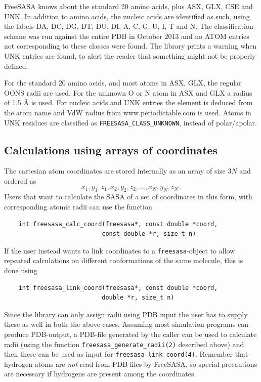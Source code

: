 \documentclass[a4paper,11pt]{article}
\begin{document}
FreeSASA knows about the standard 20 amino acids, plus ASX, GLX,
CSE and UNK. In addition to amino acids, the nucleic acids are
identified as such, using the labels DA, DC, DG, DT, DU, DI, A, C, G,
U, I, T and N. The classification scheme was run against the entire
PDB in October 2013 and no ATOM entries not corresponding to these
classes were found. The library prints a warning when UNK entries are
found, to alert the reader that something might not be properly
defined.

For the standard 20 amino acids, and most atoms in ASX, GLX, the
regular OONS radii \cite{OONS} are used. For the unknown O or N atom in
ASX and GLX a radius of 1.5 Å is used. For nucleic acids and UNK
entries the element is deduced from the atom name and VdW radius from
www.periodictable.com is used. Atoms in UNK residues are classified as
\verb|FREESASA_CLASS_UNKNOWN|, instead of polar/apolar.

\subsection{Calculations using arrays of coordinates}

The cartesian atom coordinates are stored internally as an array of
size $3N$ and ordered as $$x_1,y_1,z_1, x_2,y_2,z_2, \ldots ,x_N,y_N,z_N\,.$$
Users that want to calculate the SASA of a set of coordinates in this form,
with corresponding atomic radii can use the function
\begin{verbatim}
    int freesasa_calc_coord(freesasa*, const double *coord, 
                           const double *r, size_t n)
\end{verbatim}
If the user instead wants to link coordinates to a
\verb|freesasa|-object to allow repeated calculations on different
conformations of the same molecule, this is done using
\begin{verbatim}
    int freesasa_link_coord(freesasa*, const double *coord,
                           double *r, size_t n)
\end{verbatim}

Since the library can only assign radii using PDB input the user has
to supply these as well in both the above cases. Assuming most
simulation programs can produce PDB-output, a PDB-file generated by
the caller can be used to calculate radii (using the function
\verb|freesasa_generate_radii(2)| described above) and then these can
be used as input for \verb|freesasa_link_coord(4)|. Remember that
hydrogen atoms are \emph{not} read from PDB files by FreeSASA, so special
precautions are necessary if hydrogens are present among the
coordinates. 
\end{document}
